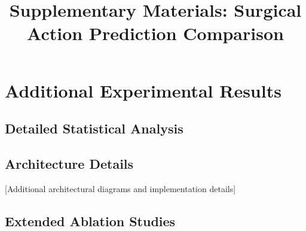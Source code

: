 \documentclass{article}
\title{Supplementary Materials: Surgical Action Prediction Comparison}
\begin{document}
\maketitle

\section{Additional Experimental Results}

\subsection{Detailed Statistical Analysis}


\subsection{Architecture Details}
[Additional architectural diagrams and implementation details]

\subsection{Extended Ablation Studies}

\end{document}
